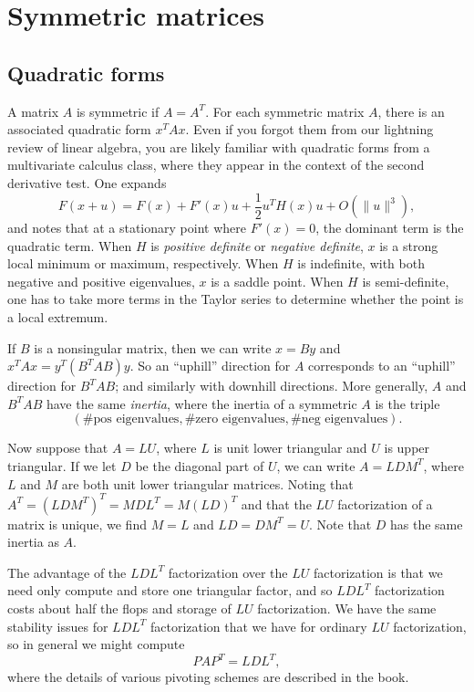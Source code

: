 \section{Symmetric matrices}

\subsection{Quadratic forms}

A matrix $A$ is symmetric if $A = A^T$.  For each symmetric matrix $A$,
there is an associated quadratic form $x^T A x$.  Even if you forgot
them from our lightning review of linear algebra, you are likely familiar
with quadratic forms from a multivariate calculus class, where they appear
in the context of the second derivative test.  One expands
\[
  F(x+u) = F(x) + F'(x) u + \frac{1}{2} u^T H(x) u + O(\|u\|^3),
\]
and notes that at a stationary point where $F'(x) = 0$, the dominant
term is the quadratic term.  When $H$ is {\em positive definite} or
{\em negative definite}, $x$ is a strong local minimum or maximum,
respectively. When $H$ is indefinite, with both negative and positive
eigenvalues, $x$ is a saddle point.  When $H$ is semi-definite, one has
to take more terms in the Taylor series to determine whether the point
is a local extremum.

If $B$ is a nonsingular matrix, then we can write $x = By$ and $x^T A
x = y^T (B^T A B) y$.  So an ``uphill'' direction for $A$ corresponds
to an ``uphill'' direction for $B^T A B$; and similarly with downhill
directions.  More generally, $A$ and $B^T A B$ have the same {\em inertia},
where the inertia of a symmetric $A$ is the triple
\[
  (\mbox{\# pos eigenvalues},
   \mbox{\# zero eigenvalues},
   \mbox{\# neg eigenvalues}).
\]

Now suppose that $A = LU$, where $L$ is unit lower triangular and $U$
is upper triangular.  If we let $D$ be the diagonal part of $U$, we
can write $A = LDM^T$, where $L$ and $M$ are both unit lower triangular
matrices.  Noting that $A^T = (LDM^T)^T = M D L^T = M (LD)^T$ and
that the $LU$ factorization of a matrix is unique, we find $M = L$
and $LD = DM^T = U$.  Note that $D$ has the same inertia as $A$.

The advantage of the $LDL^T$ factorization over the $LU$ factorization
is that we need only compute and store one triangular factor, and so
$LDL^T$ factorization costs about half the flops and storage of $LU$
factorization.  We have the same stability issues for $LDL^T$
factorization that we have for ordinary $LU$ factorization, so in
general we might compute
\[
  P A P^T = LDL^T,
\]
where the details of various pivoting schemes are described in the book.

